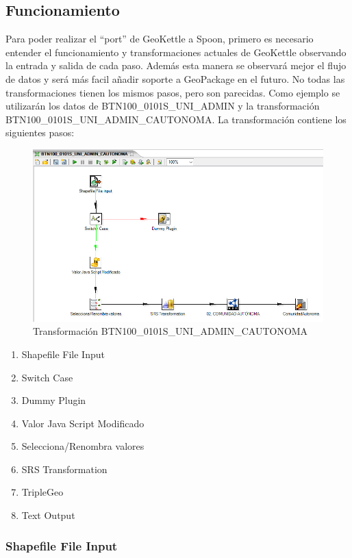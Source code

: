 \newpage
\subsection{Funcionamiento}

Para poder realizar el ``port'' de GeoKettle a Spoon, primero es necesario entender el funcionamiento y
transformaciones actuales de GeoKettle observando la entrada y salida de cada paso. Además esta manera se
observará mejor el flujo de datos y será más facil añadir soporte a GeoPackage en el futuro. No todas las
transformaciones tienen los mismos pasos, pero son parecidas. Como ejemplo se utilizarán los datos de
BTN100\_0101S\_UNI\_ADMIN y la transformación BTN100\_0101S\_UNI\_ADMIN\_CAUTONOMA. La transformación contiene
los siguientes pasos:

\begin{figure}[H]
    \includegraphics[width=\textwidth]{images/CCAA.png}
    \centering
    \caption{Transformación BTN100\_0101S\_UNI\_ADMIN\_CAUTONOMA}
    \label{fig:CCAA}
\end{figure}


\begin{enumerate}
    \item Shapefile File Input
    \item Switch Case
    \item Dummy Plugin
    \item Valor Java Script Modificado
    \item Selecciona/Renombra valores
    \item SRS Transformation
    \item TripleGeo
    \item Text Output
\end{enumerate}


\subsubsection{Shapefile File Input}

